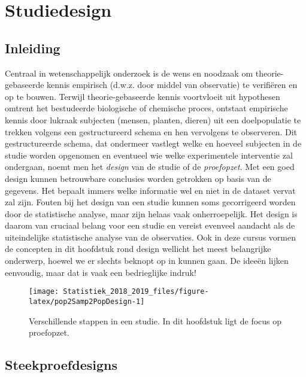 \documentclass[12pt,dutch,coursenotes]{book}
\theoremstyle{definition}
\theoremstyle{definition}
\theoremstyle{definition}
\theoremstyle{remark}
\begin{document}
\chapter{Studiedesign}\label{chap:design}

\section{Inleiding}\label{inleiding-1}

Centraal in wetenschappelijk onderzoek is de wens en noodzaak om
theorie-gebaseerde kennis empirisch (d.w.z. door middel van observatie)
te verifiëren en op te bouwen. Terwijl theorie-gebaseerde kennis
voortvloeit uit hypothesen omtrent het bestudeerde biologische of
chemische proces, ontstaat empirische kennis door lukraak subjecten
(mensen, planten, dieren) uit een doelpopulatie te trekken volgens een
gestructureerd schema en hen vervolgens te observeren. Dit
gestructureerde schema, dat ondermeer vastlegt welke en hoeveel
subjecten in de studie worden opgenomen en eventueel wie welke
experimentele interventie zal ondergaan, noemt men het \emph{design} van
de studie of de \emph{proefopzet}. Met een goed design kunnen
betrouwbare conclusies worden getrokken op basis van de gegevens. Het
bepaalt immers welke informatie wel en niet in de dataset vervat zal
zijn. Fouten bij het design van een studie kunnen soms gecorrigeerd
worden door de statistische analyse, maar zijn helaas vaak
onherroepelijk. Het design is daarom van cruciaal belang voor een studie
en vereist evenveel aandacht als de uiteindelijke statistische analyse
van de observaties. Ook in deze cursus vormen de concepten in dit
hoofdstuk rond design wellicht het meest belangrijke onderwerp, hoewel
we er slechts beknopt op in kunnen gaan. De ideeën lijken eenvoudig,
maar dat is vaak een bedrieglijke indruk!

\begin{figure}

{\centering \texttt{[image: Statistiek\_2018\_2019\_files/figure-latex/pop2Samp2PopDesign-1]} 

}

\caption{Verschillende stappen in een studie. In dit hoofdstuk ligt de focus op proefopzet.}\label{fig:pop2Samp2PopDesign}
\end{figure}

\section{Steekproefdesigns}\label{sec:steekproefdesigns}
\end{document}
